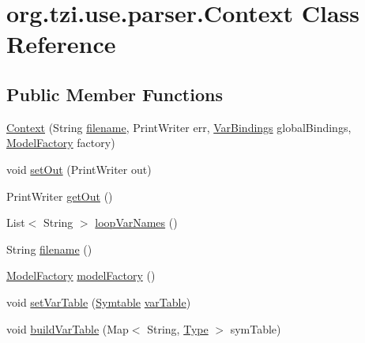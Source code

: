 \hypertarget{classorg_1_1tzi_1_1use_1_1parser_1_1_context}{\section{org.\-tzi.\-use.\-parser.\-Context Class Reference}
\label{classorg_1_1tzi_1_1use_1_1parser_1_1_context}
}
\subsection*{Public Member Functions}
\begin{DoxyCompactItemize}
\item 
\hyperlink{classorg_1_1tzi_1_1use_1_1parser_1_1_context_a46301362b31ad00320fb21d94eb2933a}{Context} (String \hyperlink{classorg_1_1tzi_1_1use_1_1parser_1_1_context_ae8fd628dae45190d5f5250b243650b19}{filename}, Print\-Writer err, \hyperlink{classorg_1_1tzi_1_1use_1_1uml_1_1ocl_1_1value_1_1_var_bindings}{Var\-Bindings} global\-Bindings, \hyperlink{classorg_1_1tzi_1_1use_1_1uml_1_1mm_1_1_model_factory}{Model\-Factory} factory)
\item 
void \hyperlink{classorg_1_1tzi_1_1use_1_1parser_1_1_context_ae3f3b78630e7f0d2c3d8e4a3f966690a}{set\-Out} (Print\-Writer out)
\item 
Print\-Writer \hyperlink{classorg_1_1tzi_1_1use_1_1parser_1_1_context_a164adb6a60629e7d5921d2c9df220ce5}{get\-Out} ()
\item 
List$<$ String $>$ \hyperlink{classorg_1_1tzi_1_1use_1_1parser_1_1_context_af4bb0b4c48a1fd1e57f4a4eca1a16bd1}{loop\-Var\-Names} ()
\item 
String \hyperlink{classorg_1_1tzi_1_1use_1_1parser_1_1_context_ae8fd628dae45190d5f5250b243650b19}{filename} ()
\item 
\hyperlink{classorg_1_1tzi_1_1use_1_1uml_1_1mm_1_1_model_factory}{Model\-Factory} \hyperlink{classorg_1_1tzi_1_1use_1_1parser_1_1_context_a39d3e1624b1e821122ae944cf40d1698}{model\-Factory} ()
\item 
void \hyperlink{classorg_1_1tzi_1_1use_1_1parser_1_1_context_a06fc6899ba4eae4fdf86e0d8545d8dfd}{set\-Var\-Table} (\hyperlink{classorg_1_1tzi_1_1use_1_1parser_1_1_symtable}{Symtable} \hyperlink{classorg_1_1tzi_1_1use_1_1parser_1_1_context_ac3c5ca439a1b5b2af819f66b65e0d3dc}{var\-Table})
\item 
void \hyperlink{classorg_1_1tzi_1_1use_1_1parser_1_1_context_a57626f988a7ae6b08a70e214b812f6c1}{build\-Var\-Table} (Map$<$ String, \hyperlink{interfaceorg_1_1tzi_1_1use_1_1uml_1_1ocl_1_1type_1_1_type}{Type} $>$ sym\-Table)

\end{DoxyCompactItemize}
